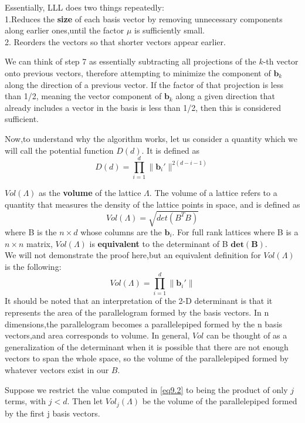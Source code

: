 Essentially, LLL does two things repeatedly:
\\
1.Reduces the \textbf{size} of each basis vector by removing unnecessary components along earlier ones,until the factor $\mu$ is sufficiently small.\\
2. Reorders the vectors so that shorter vectors appear earlier.

We can think of step 7 as essentially subtracting all projections of the $k$-th vector onto previous vectors, therefore attempting to minimize the component of $\mathbf{b}_k$ along the direction of a previous vector. If the factor of that projection is less than 1/2, meaning the vector component of $\mathbf{b}_k$ along a given direction that already includes a vector in the basis is less than 1/2, then this is considered sufficient.

Now,to understand why the algorithm works, let us consider a quantity which we will call the potential function $D(d)$. It is defined as $$D(d) = \prod_{i=1}^d \lVert \mathbf{b}_i' \rVert^{2(d-i-1)}$$

$Vol(\Lambda)$ as the \textbf{volume} of the lattice $\Lambda$. The volume of a lattice refers to a quantity that measures the density of the lattice points in space, and is defined as 
\begin{equation}
    Vol(\Lambda) = \sqrt{det(B^T B)}
\end{equation}
where B is the $n \times d$ whose columns are the $\mathbf{b}_i$.
For full rank lattices where B is a $n \times n$ matrix, $Vol(\Lambda)$ is \textbf{equivalent} to the determinant of B $\mathbf{det(B)}$.\\
We will not demonstrate the proof here,but an equivalent definition for $Vol(\Lambda)$ is the following:
\begin{equation}
    Vol(\Lambda) = \prod_{i=1}^d \lVert \mathbf{b}_i' \rVert
    \label{eq9.2}
\end{equation}
It should be noted that an interpretation of the 2-D determinant is that it represents the area of the parallelogram formed by the basis vectors. In n dimensions,the parallelogram becomes a parallelepiped formed by the n basis vectors,and area corresponds to volume. In general, $Vol$ can be thought of as a generalization of the determinant when it is possible that there are not enough vectors to span the whole space, so the volume of the parallelepiped formed by whatever vectors exist in our $B$.

Suppose we restrict the value computed in \eqref{eq9.2} to being the product of only $j$ terms, with $j < d$. Then let $Vol_j(\Lambda)$ be the volume of the parallelepiped formed by the first j basis vectors.

